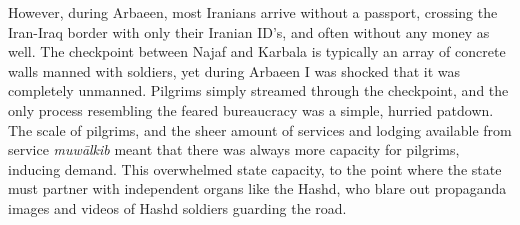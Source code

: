 However, during Arbaeen, most Iranians arrive without a passport, crossing the Iran-Iraq border with only their Iranian ID's, and often without any money as well. The checkpoint between Najaf and Karbala is typically an array of concrete walls manned with soldiers, yet during Arbaeen I was shocked that it was completely unmanned. Pilgrims simply streamed through the checkpoint, and the only process resembling the feared bureaucracy was a simple, hurried patdown. The scale of pilgrims, and the sheer amount of services and lodging available from service \emph{muwālkib} meant that there was always more capacity for pilgrims, inducing demand. This overwhelmed state capacity, to the point where the state must partner with independent organs like the Hashd, who blare out propaganda images and videos of Hashd soldiers guarding the road. 




